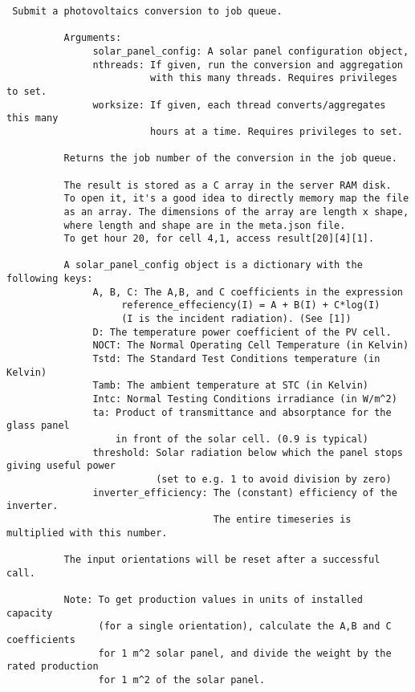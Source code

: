 \begin{verbatim}
 Submit a photovoltaics conversion to job queue.

          Arguments:
               solar_panel_config: A solar panel configuration object,
               nthreads: If given, run the conversion and aggregation
                         with this many threads. Requires privileges to set.
               worksize: If given, each thread converts/aggregates this many
                         hours at a time. Requires privileges to set.

          Returns the job number of the conversion in the job queue.
    
          The result is stored as a C array in the server RAM disk.
          To open it, it's a good idea to directly memory map the file
          as an array. The dimensions of the array are length x shape,
          where length and shape are in the meta.json file.
          To get hour 20, for cell 4,1, access result[20][4][1].

          A solar_panel_config object is a dictionary with the following keys:
               A, B, C: The A,B, and C coefficients in the expression
                    reference_effeciency(I) = A + B(I) + C*log(I)
                    (I is the incident radiation). (See [1])
               D: The temperature power coefficient of the PV cell.
               NOCT: The Normal Operating Cell Temperature (in Kelvin)
               Tstd: The Standard Test Conditions temperature (in Kelvin)
               Tamb: The ambient temperature at STC (in Kelvin)
               Intc: Normal Testing Conditions irradiance (in W/m^2)
               ta: Product of transmittance and absorptance for the glass panel
                   in front of the solar cell. (0.9 is typical)
               threshold: Solar radiation below which the panel stops giving useful power
                          (set to e.g. 1 to avoid division by zero)
               inverter_efficiency: The (constant) efficiency of the inverter.
                                    The entire timeseries is multiplied with this number.

          The input orientations will be reset after a successful call.

          Note: To get production values in units of installed capacity
                (for a single orientation), calculate the A,B and C coefficients
                for 1 m^2 solar panel, and divide the weight by the rated production
                for 1 m^2 of the solar panel.


\end{verbatim}
